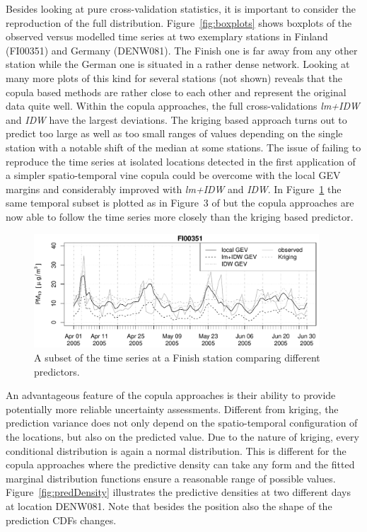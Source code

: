 \documentclass[article,nojss]{jss}
\begin{document}
Besides looking at pure cross-validation statistics, it is important to consider the reproduction of the full distribution. Figure~\ref{fig:boxplots} shows boxplots of the observed versus modelled time series at two exemplary stations in Finland (FI00351) and Germany (DENW081). The Finish one is far away from any other station while the German one is situated in a rather dense network. Looking at many more plots of this kind for several stations (not shown) reveals that the copula based methods are rather close to each other and represent the original data quite well. Within the copula approaches, the full cross-validations \emph{lm+IDW} and \emph{IDW} have the largest deviations. The kriging based approach turns out to predict too large as well as too small ranges of values depending on the single station with a notable shift of the median at some stations. The issue of failing to reproduce the time series at isolated locations detected in the first application of a simpler spatio-temporal vine copula \citep{Graler2012a} could be overcome with the local GEV margins and considerably improved with \emph{lm+IDW} and \emph{IDW}. In Figure~\ref{fig:FI00351} the same temporal subset is plotted as in Figure~3 of \citet{Graler2012a} but the copula approaches are now able to follow the time series more closely than the kriging based predictor. 

\begin{figure}
\center
\includegraphics[width=0.95\textwidth]{FI00351_ts.pdf}
\caption{A subset of the time series at a Finish station comparing different predictors.\label{fig:FI00351}}
\end{figure}

An advantageous feature of the copula approaches is their ability to provide potentially more reliable uncertainty assessments. Different from kriging, the prediction variance does not only depend on the spatio-temporal configuration of the locations, but also on the predicted value. Due to the nature of kriging, every conditional distribution is again a normal distribution. This is different for the copula approaches where the predictive density can take any form and the fitted marginal distribution functions ensure a reasonable range of possible values. Figure~\ref{fig:predDensity} illustrates the predictive densities at two different days at location DENW081. Note that besides the position also the shape of the prediction CDFs changes.
\end{document}
